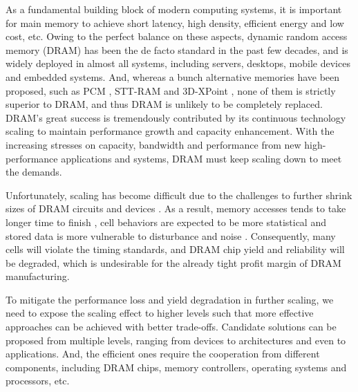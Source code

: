 As a fundamental building block of  modern computing systems, it is important for main memory to achieve short latency, high density, efficient energy and low cost, etc. Owing to the perfect balance on these aspects,  dynamic random access memory (DRAM) has been the de facto standard in the past few decades, and is widely deployed in almost all systems, including servers, desktops, mobile devices and embedded systems. 
And, whereas a bunch alternative memories have been proposed, such as PCM \cite{ISCA09:pcm}, STT-RAM \cite{ISPASS13:stt} and 3D-XPoint \cite{SOSP15:xpoint}, none of them is strictly superior to DRAM, and thus DRAM is unlikely to be completely replaced.
DRAM's great success is tremendously contributed by its continuous technology scaling 
to maintain performance growth and capacity enhancement. With the increasing stresses on capacity, bandwidth and performance from new high-performance applications and systems, DRAM must keep scaling down to meet the demands.

Unfortunately, scaling has become difficult due to the challenges to further shrink sizes of DRAM circuits and devices \cite{IBM02:scaling, IEDM10:scaling, MEMSYS15:twr}. 
As a result, memory accesses tends to take longer time to finish \cite{PATENT14:twr, PATENT15:twr}, cell behaviors are expected to be more statistical \cite{MEMSYS15:twr} and stored data is more vulnerable to disturbance and noise \cite{ISCA14:disturbance, DSN15:avatar, MEM14:twr}.
Consequently, many cells will violate the timing standards, and DRAM chip yield and reliability will be degraded, which is undesirable for the already tight profit margin of DRAM manufacturing. 

To mitigate the performance loss and yield degradation in further scaling, we need to expose the scaling effect to higher levels such that more effective approaches can be achieved with better trade-offs.  Candidate solutions can be proposed from multiple levels, ranging from devices to architectures and even to applications. And, the efficient ones require the cooperation from different components, including DRAM chips, memory controllers, operating systems and processors, etc.

